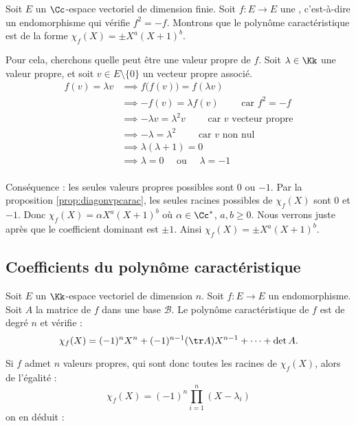 \documentclass[12pt, class=report,crop=false]{standalone}
\begin{document}
\begin{exemple}
Soit $E$ un $\Cc$-espace vectoriel de dimension finie.
Soit $f : E \to E$ une , c'est-à-dire un endomorphisme qui vérifie
$f^2 = -f$. Montrons que le polynôme caractéristique est de la forme $\chi_f(X) = \pm X^a(X+1)^b$.

Pour cela, cherchons quelle peut être une valeur propre de $f$. Soit $\lambda \in \Kk$ une valeur propre, et soit $v \in E \setminus \{0\}$ un vecteur propre associé.
\begin{align*}
       f(v) = \lambda v 
  & \implies f\big( f(v) \big)  = f(\lambda v) \\
  & \implies -f(v) = \lambda  f(v) \qquad \text{ car } f^2 = -f \\
  & \implies -\lambda v  = \lambda^2 v \qquad \text{ car $v$ vecteur propre} \\
  & \implies -\lambda = \lambda^2 \qquad \text{ car $v$ non nul } \\
  & \implies \lambda(\lambda+1) = 0 \\
  & \implies \lambda = 0 \quad \text{ ou } \quad \lambda = -1 \\
\end{align*}

Conséquence : les seules valeurs propres possibles sont $0$ ou $-1$.
Par la proposition \ref{prop:diagonvpcarac}, les seules racines possibles de $\chi_f(X)$ sont 
$0$ et $-1$. Donc $\chi_f(X) = \alpha X^a(X+1)^b$ où $\alpha\in \Cc^*$, $a,b\ge0$. Nous verrons juste après
que le coefficient dominant est $\pm1$. Ainsi $\chi_f(X) = \pm X^a(X+1)^b$.
\end{exemple}


\subsection{Coefficients du polynôme caractéristique}



\begin{proposition}
\label{prop:polcartrdetbis}
Soit $E$ un $\Kk$-espace vectoriel de dimension $n$.
Soit $f : E \to E$ un endomorphisme. Soit $A$ la matrice de $f$ dans une base $\mathcal{B}$.
Le polynôme caractéristique de $f$ est de degré $n$ et vérifie :
$$\chi_f(X)=(-1)^n X^n + (-1)^{n-1}(\tr A)X^{n-1}+\dots+\det A.$$
\end{proposition} 


Si $f$ admet $n$ valeurs propres, qui sont donc toutes les racines de $\chi_f(X)$, alors de l'égalité :
$$\chi_f(X)=(-1)^n \prod_{i=1}^n(X-\lambda_i)$$
on en déduit :
\end{document}
